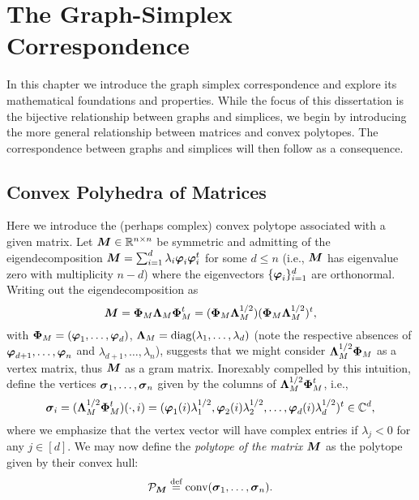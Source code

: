 \chapter{The Graph-Simplex Correspondence}
\label{chap:correspondence}

In this chapter we introduce the graph simplex correspondence and explore its mathematical foundations and properties. While the focus of this dissertation is the bijective relationship between graphs and simplices, we begin by introducing the more general relationship between matrices and convex polytopes. The correspondence between graphs and simplices will then follow as a consequence. 


\section{Convex Polyhedra of Matrices}
\label{sec:correspondence_polyhedra_matrices}
Here we introduce the (perhaps complex) convex polytope associated with a given matrix. Let ${\vb*{M}}\in \mathbb{R}^{n\times n}$ be symmetric and admitting of the eigendecomposition ${\vb*{M}}=\sum_{i=1}^d \lambda_i \vb*{\varphi}_i\vb*{\varphi}_i^t$ for some $d\leq n$ (i.e., ${\vb*{M}}$ has eigenvalue zero with multiplicity $n-d$) where the eigenvectors $\{\vb*{\varphi}_i\}_{i=1}^d $ are orthonormal. Writing out the eigendecomposition as 
\begin{equation*}
{\vb*{M}}=\boldsymbol{\Phi}_M\vb{\Lambda}_M\boldsymbol{\Phi}_M^t=(\boldsymbol{\Phi}_M\vb{\Lambda}_M^{1/2})(\boldsymbol{\Phi}_M\vb{\Lambda}_M^{1/2})^t,
\end{equation*}
with $\boldsymbol{\Phi}_M = (\vb*{\varphi}_1,\dots,\vb*{\varphi}_d)$, $\vb{\Lambda}_M=\text{diag}(\lambda_1,\dots,\lambda_d)$ (note the respective absences of $\vb*{\varphi}_{d+1},\dots,\\\vb*{\varphi}_n$ and $\lambda_{d+1},\dots,\lambda_n$), suggests that we might consider $\vb{\Lambda}_M^{1/2}\boldsymbol{\Phi}_M$ as a vertex matrix, thus ${\vb*{M}}$ as a gram matrix. 
Inorexably compelled by this intuition, define the vertices $\vb*{\sigma}_1,\dots,\vb*{\sigma}_n$ given by the columns of $\vb{\Lambda}_M^{1/2}\boldsymbol{\Phi}_M^t$, i.e.,  
\begin{equation*}
    \vb*{\sigma}_i = (\vb{\Lambda}_M^{1/2}\boldsymbol{\Phi}_M^t) (\cdot,i) = (\vb*{\varphi}_1(i)\lambda_1^{1/2}, \vb*{\varphi}_2(i)\lambda_2^{1/2},\dots,\vb*{\varphi}_d(i)\lambda_d^{1/2})^t\in \mathbb{C}^d,
\end{equation*}
where we emphasize that the vertex vector will have complex entries if $\lambda_j<0$ for any $j\in[d]$. We may now define the \emph{polytope of the matrix ${\vb*{M}}$} as the polytope given by their convex hull:
\begin{equation*}
\mathcal{P}_{\vb*{M}}\overset{\text{def}}{=} \textnormal{conv}(\vb*{\sigma}_1,\dots,\vb*{\sigma}_n).
\end{equation*}
